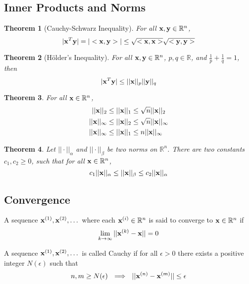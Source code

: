 \documentclass[11pt]{article}
\def\x{{\bf x}}
\def\y{{\bf y}}
\def\BR{{\mathbb R}}
\newtheorem{theorem}{Theorem}[section]
\begin{document}
\subsection{Inner Products and Norms}
\begin{theorem}
	[Cauchy-Schwarz Inequality] For all $\x,\y\in \BR^n$, 
	$$|\x^T\y|=|<\x,\y>| \le \sqrt{<\x,\x>}\sqrt{<\y,\y>}$$
\end{theorem}
\begin{theorem}
	[H\"{o}lder's Inequality] For all $\x,\y\in \BR^n$, $p,q\in \BR$, and $\frac{1}{p}+\frac{1}{q}=1$, then 
	$$|\x^T\y|\le ||\x||_p ||\y||_q$$
\end{theorem}
\begin{theorem}
	For all $\x\in \BR^n$,
	\[
	\begin{aligned}
	||\x||_2 &\le ||\x||_1 \le \sqrt{n}||\x||_2 \\
	||\x||_\infty &\le ||\x||_2 \le \sqrt{n}||\x||_\infty \\
	||\x||_\infty &\le ||\x||_1 \le n||\x||_\infty 
	\end{aligned}
	\]
	
\end{theorem}

\begin{theorem}
	Let $||\cdot||_\alpha$ and $||\cdot||_\beta$ be two norms on $\BR^n$. There are two constants $c_1,c_2\ge 0$, such that for all $\x\in \BR^n$, 
	$$c_1||\x||_\alpha\le ||\x||_\beta \le c_2 ||\x||_\alpha$$
\end{theorem}

\subsection{Convergence}
A sequence $\x^{(1)},\x^{(2)},\dots$ where each $\x^{(i)}\in \BR^n$ is said to converge to $\x\in \BR^n$ if 
\[
\lim_{k\to\infty}||\x^{(k)}-\x||=0
\]

A sequence $\x^{(1)},\x^{(2)},\dots$ is called Cauchy if for all $\epsilon>0$ there exists a positive integer $N(\epsilon)$ such that 
$$n,m\ge N(\epsilon) \ \  \Longrightarrow \ \   ||\x^{(n)}-\x^{(m)}||\le\epsilon$$
\end{document}
